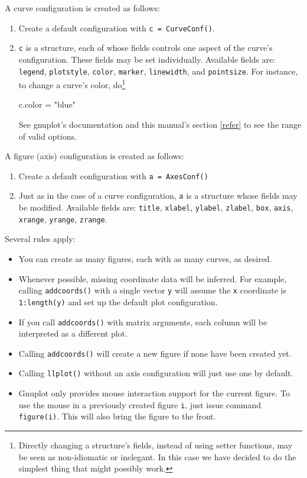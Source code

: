 \documentclass[11pt]{article}
\newcommand{\cmd}[1]{\texttt{#1}}
\begin{document}
A curve configuration is created as follows:
\begin{enumerate}
	\item Create a default configuration with \cmd{c = CurveConf()}.
	\item \cmd{c} is a structure, each of whose fields controls one aspect of
		the curve's configuration. These fields may be set individually.
		Available fields are: \cmd{legend}, \cmd{plotstyle}, \cmd{color},
		\cmd{marker}, \cmd{linewidth}, and \cmd{pointsize}. For instance, to
		change a curve's color, do\footnote{Directly changing a structure's
		fields, instead of using setter functions, may be seen as non-idiomatic
		or inelegant. In this case we have decided to do the simplest thing
		that might possibly work.}

\begin{juliacode}
c.color = "blue"
\end{juliacode}

See gnuplot's documentation and this manual's section \ref{refer} to see the
range of valid options.

\end{enumerate}

A figure (axis) configuration is created as follows:
\begin{enumerate}
	\item Create a default configuration with \cmd{a = AxesConf()}
	\item Just as in the case of a curve configuration, \cmd{a} is a structure
		whose fields may be modified. Available fields are: \cmd{title},
		\cmd{xlabel}, \cmd{ylabel}, \cmd{zlabel}, \cmd{box}, \cmd{axis},
		\cmd{xrange}, \cmd{yrange}, \cmd{zrange}.
\end{enumerate}

Several rules apply:
\begin{itemize}
	\item You can create as many figures, each with as many curves, as desired.
	\item Whenever possible, missing coordinate data will be inferred. For
		example, calling \cmd{addcoords()} with a single vector \cmd{y}
		will assume the \cmd{x} coordinate is \cmd{1:length(y)} and set up the
		default plot configuration.
	\item If you call \cmd{addcoords()} with matrix arguments, each column will
		be interpreted as a different plot.
	\item Calling \cmd{addcoords()} will create a new figure if none have been
		created yet.
	\item Calling \cmd{llplot()} without an axis configuration will just use one
		by default.
	\item Gnuplot only provides mouse interaction support for the current
		figure. To use the mouse in a previously created figure \cmd{i}, just
		issue command \cmd{figure(i)}. This will also bring the figure to the
		front.
\end{itemize}
\end{document}
